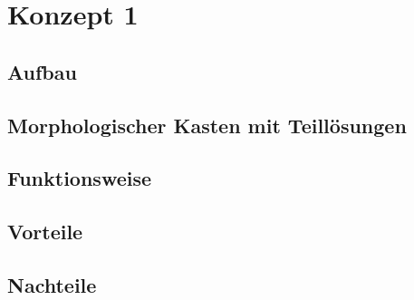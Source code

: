 \section{Konzept 1}

\subsection{Aufbau}

\subsection{Morphologischer Kasten mit Teill\"{o}sungen}

\subsection{Funktionsweise}

\subsection{Vorteile}

\subsection{Nachteile}
